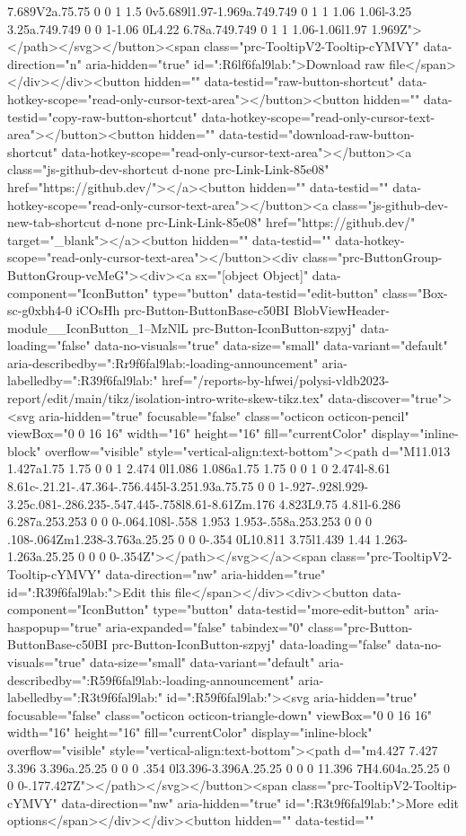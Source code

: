 {{{{{{{{{{{{{{{{{{{{{{{{{{{{{7.689V2a.75.75 0 0 1 1.5 0v5.689l1.97-1.969a.749.749 0 1 1 1.06 1.06l-3.25 3.25a.749.749 0 0 1-1.06 0L4.22 6.78a.749.749 0 1 1 1.06-1.06l1.97 1.969Z"></path></svg></button><span class="prc-TooltipV2-Tooltip-cYMVY" data-direction="n" aria-hidden="true" id=":R6lf6fal9lab:">Download raw file</span></div></div><button hidden="" data-testid="raw-button-shortcut" data-hotkey-scope="read-only-cursor-text-area"></button><button hidden="" data-testid="copy-raw-button-shortcut" data-hotkey-scope="read-only-cursor-text-area"></button><button hidden="" data-testid="download-raw-button-shortcut" data-hotkey-scope="read-only-cursor-text-area"></button><a class="js-github-dev-shortcut d-none prc-Link-Link-85e08" href="https://github.dev/"></a><button hidden="" data-testid="" data-hotkey-scope="read-only-cursor-text-area"></button><a class="js-github-dev-new-tab-shortcut d-none prc-Link-Link-85e08" href="https://github.dev/" target="_blank"></a><button hidden="" data-testid="" data-hotkey-scope="read-only-cursor-text-area"></button><div class="prc-ButtonGroup-ButtonGroup-vcMeG"><div><a sx="[object Object]" data-component="IconButton" type="button" data-testid="edit-button" class="Box-sc-g0xbh4-0 iCOsHh prc-Button-ButtonBase-c50BI BlobViewHeader-module__IconButton_1--MzNlL prc-Button-IconButton-szpyj" data-loading="false" data-no-visuals="true" data-size="small" data-variant="default" aria-describedby=":Rr9f6fal9lab:-loading-announcement" aria-labelledby=":R39f6fal9lab:" href="/reports-by-hfwei/polysi-vldb2023-report/edit/main/tikz/isolation-intro-write-skew-tikz.tex" data-discover="true"><svg aria-hidden="true" focusable="false" class="octicon octicon-pencil" viewBox="0 0 16 16" width="16" height="16" fill="currentColor" display="inline-block" overflow="visible" style="vertical-align:text-bottom"><path d="M11.013 1.427a1.75 1.75 0 0 1 2.474 0l1.086 1.086a1.75 1.75 0 0 1 0 2.474l-8.61 8.61c-.21.21-.47.364-.756.445l-3.251.93a.75.75 0 0 1-.927-.928l.929-3.25c.081-.286.235-.547.445-.758l8.61-8.61Zm.176 4.823L9.75 4.81l-6.286 6.287a.253.253 0 0 0-.064.108l-.558 1.953 1.953-.558a.253.253 0 0 0 .108-.064Zm1.238-3.763a.25.25 0 0 0-.354 0L10.811 3.75l1.439 1.44 1.263-1.263a.25.25 0 0 0 0-.354Z"></path></svg></a><span class="prc-TooltipV2-Tooltip-cYMVY" data-direction="nw" aria-hidden="true" id=":R39f6fal9lab:">Edit this file</span></div><div><button data-component="IconButton" type="button" data-testid="more-edit-button" aria-haspopup="true" aria-expanded="false" tabindex="0" class="prc-Button-ButtonBase-c50BI prc-Button-IconButton-szpyj" data-loading="false" data-no-visuals="true" data-size="small" data-variant="default" aria-describedby=":R59f6fal9lab:-loading-announcement" aria-labelledby=":R3t9f6fal9lab:" id=":R59f6fal9lab:"><svg aria-hidden="true" focusable="false" class="octicon octicon-triangle-down" viewBox="0 0 16 16" width="16" height="16" fill="currentColor" display="inline-block" overflow="visible" style="vertical-align:text-bottom"><path d="m4.427 7.427 3.396 3.396a.25.25 0 0 0 .354 0l3.396-3.396A.25.25 0 0 0 11.396 7H4.604a.25.25 0 0 0-.177.427Z"></path></svg></button><span class="prc-TooltipV2-Tooltip-cYMVY" data-direction="nw" aria-hidden="true" id=":R3t9f6fal9lab:">More edit options</span></div></div><button hidden="" data-testid="" }}}}}}}}}}}}}}}}}}}}}}}}}}}}}
